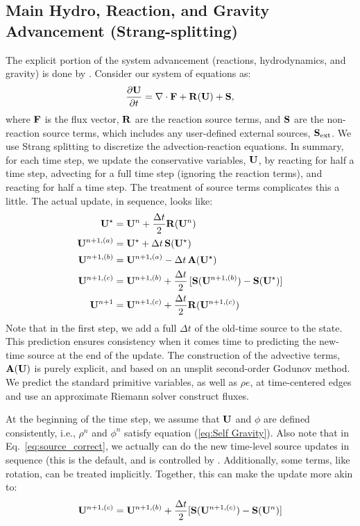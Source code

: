 \subsection{Main Hydro, Reaction, and Gravity Advancement (Strang-splitting)}

The explicit portion of the system advancement (reactions,
hydrodynamics, and gravity) is done by .  Consider
our system of equations as:
\begin{equation}
\frac{\partial{\bf U}}{\partial t} = \nabla\cdot{\bf F} + {\bf R}({\bf U}) + {\bf S},
\end{equation}
where ${\bf F}$ is the flux vector, ${\bf R}$ are the reaction
source terms, and ${\bf S}$ are the non-reaction source terms, which
includes any user-defined external sources, ${\bf S}_{\rm ext}$.  We use
Strang splitting to discretize the advection-reaction equations.  In
summary, for each time step, we update the conservative variables,
${\bf U}$, by reacting for half a time step, advecting for a full time
step (ignoring the reaction terms), and reacting for half a time step.
The treatment of source terms complicates this a little.  The actual
update, in sequence, looks like:
\begin{align}
{\bf U}^\star &= {\bf U}^n + \frac{\Delta t}{2}{\bf R}({\bf U}^n) \\
{\bf U}^{n+1,(a)} &= {\bf U}^\star + \Delta t\, {\bf S}({\bf U}^\star) \\
{\bf U}^{n+1,(b)} &= {\bf U}^{n+1,(a)} - \Delta t\, {\bf A}({\bf U}^\star) \\
{\bf U}^{n+1,(c)} &= {\bf U}^{n+1,(b)} + \frac{\Delta t}{2}\, [{\bf S}({\bf U}^{n+1,(b)}) - {\bf S}({\bf U}^\star)] \label{eq:source_correct}\\
{\bf U}^{n+1}     &= {\bf U}^{n+1,(c)} + \frac{\Delta t}{2} {\bf R}({\bf U}^{n+1,(c)})
\end{align}
Note that in the first step, we add a full $\Delta t$ of the old-time
source to the state.  This prediction ensures consistency when it
comes time to predicting the new-time source at the end of the update.
The construction of the advective terms, ${\bf A({\bf U})}$ is purely
explicit, and based on an unsplit second-order Godunov method.  We
predict the standard primitive variables, as well as $\rho e$, at
time-centered edges and use an approximate Riemann solver construct
fluxes.

At the beginning of the time step, we assume that ${\bf U}$ and $\phi$ are
defined consistently, i.e., $\rho^n$ and $\phi^n$ satisfy equation
(\ref{eq:Self Gravity}).  Also note that in
Eq.~\ref{eq:source_correct}, we actually can do the new time-level
source updates in sequence (this is the default, and is controlled by
.  Additionally, some
terms, like rotation, can be treated implicitly.  Together, this can
make the update more akin to:
\begin{equation}
{\bf U}^{n+1,(c)} = {\bf U}^{n+1,(b)} + \frac{\Delta t}{2} [{\bf S}({\bf U}^{n+1,(c)}) - {\bf S}({\bf U}^n)]
\end{equation}

